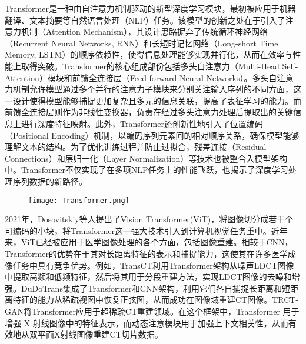 Transformer\cite{vaswaniAttentionAllYou2017}是一种由自注意力机制驱动的新型深度学习模块，最初被应用于机器翻译、文本摘要等自然语言处理（NLP）任务。该模型的创新之处在于引入了注意力机制（Attention Mechanism），其设计思路摒弃了传统循环神经网络（Recurrent Neural Networks, RNN）和长短时记忆网络（Long-short Time Memory, LSTM）的顺序依赖性，使得信息处理能够实现并行化，从而在效率与性能上取得突破。Transformer的核心组成部份包括多头自注意力（Multi-Head Self-Attention）模块和前馈全连接层（Feed-forward Neural Networks）。多头自注意力机制允许模型通过多个并行的注意力子模块来分别关注输入序列的不同方面，这一设计使得模型能够捕捉更加复杂且多元的信息关联，提高了表征学习的能力。而前馈全连接层则作为非线性变换器，负责在经过多头注意力处理后提取出的关键信息上进行深度特征映射。此外，Transformer还创新性地引入了位置编码（Positional Encoding）机制，以编码序列元素间的相对顺序关系，确保模型能够理解文本的结构。为了优化训练过程并防止过拟合，残差连接（Residual Connections）和层归一化（Layer Normalization）等技术也被整合入模型架构中。Transformer不仅实现了在多项NLP任务上的性能飞跃，也揭示了深度学习处理序列数据的新路径。


\begin{figure}[!htp]
  \centering
  \texttt{[image: Transformer.png]}
  \label{fig. Transformer}
\end{figure}


2021年，Dosovitskiy等人提出了Vision Transformer(ViT)\cite{dosovitskiyImageWorth16x162021a}，将图像切分成若干个可编码的小块，将Transformer这一强大技术引入到计算机视觉任务重中。近年来，ViT已经被应用于医学图像处理的各个方面，包括图像重建\cite{shenCOTRConvolutionTransformer2021,zhangTransCTDualPathTransformer2021,wangDuDoTransDualDomainTransformer2022,caoSwinUnetUnetLikePure2023,heH2FormerEfficientHierarchical2023,huangMISSFormerEffectiveTransformer2023,wangMISSU3DMedical2023,dalmazResViTResidualVision2022,wangTRCTGANCTReconstruction2023}。相较于CNN，Transformer的优势在于其对长距离特征的表示和捕捉能力，这使其在许多医学成像任务中具有竞争优势。例如，TransCT\cite{zhangTransCTDualPathTransformer2021}利用Transformer架构从噪声LDCT图像中提取高频和低频特征，然后将其用于分段重建方法，实现LDCT图像的去噪和增强。DuDoTrans\cite{wangDuDoTransDualDomainTransformer2022}集成了Transformer和CNN架构，利用它们各自捕捉长距离和短距离特征的能力从稀疏视图中恢复正弦图，从而成功在图像域重建CT图像。TRCT-GAN\cite{wangTRCTGANCTReconstruction2023}将Transformer应用于超稀疏CT重建领域。在这个框架中，Transformer 用于增强 X 射线图像中的特征表示，而动态注意模块用于加强上下文相关性，从而有效地从双平面X射线图像重建CT切片数据。

